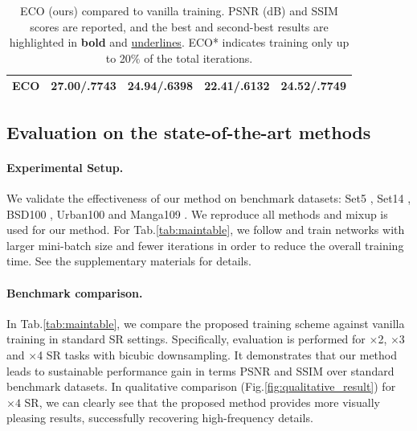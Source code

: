 \documentclass[letterpaper]{article} %
\begin{document}
\begin{table}[h]
\begin{tabular}{l|l|l|l|l}
ECO              & \textbf{27.00}/\textbf{.7743}             & \textbf{24.94}/\textbf{.6398}             & \textbf{22.41}/\textbf{.6132}             & \textbf{24.52}/\textbf{.7749}                 \\
\hline
\hline
%
%
\end{tabular}
\caption{ECO (ours) compared to vanilla training. PSNR (dB) and SSIM scores are reported, and the best and second-best results are highlighted in \textbf{bold} and \underline{underlines}. ECO* indicates training only up to 20$\%$ of the total iterations.}
\label{tab:ablation_table}
\end{table}



\subsection{Evaluation on the state-of-the-art methods}

\paragraph{Experimental Setup.}
We validate the effectiveness of our method on benchmark datasets: Set5 \cite{set5}, Set14 \cite{set14}, BSD100 \cite{bsd100}, Urban100 \cite{urban100} and Manga109 \cite{manga109}.
We reproduce all methods and mixup is used for our method. For Tab.\ref{tab:maintable}, we follow \cite{rcanit} and train networks with larger mini-batch size and fewer iterations in order to reduce the overall training time. See the supplementary materials for details.





\paragraph{Benchmark comparison.}
In Tab.\ref{tab:maintable}, we compare the proposed training scheme against vanilla training in standard SR settings. Specifically, evaluation is performed for $\times$2, $\times$3 and $\times$4 SR tasks with bicubic downsampling. It demonstrates that our method leads to sustainable performance gain in terms PSNR and SSIM over standard benchmark datasets. In qualitative comparison (Fig.\ref{fig:qualitative_result}) for $\times 4$ SR, we can clearly see that the proposed method provides more visually pleasing results, successfully recovering high-frequency details.
\end{document}
